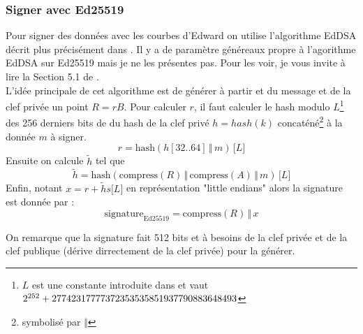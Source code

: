 \documentclass[a4paper, 12pt]{article}
\begin{document}
\subsubsection{Signer avec Ed25519}
Pour signer des données avec les courbes d'Edward on utilise l'algorithme EdDSA décrit plus précisément dans \cite{eddsa}.
Il y a de paramètre généreaux propre à l'agorithme EdDSA sur Ed25519 mais je ne les présentes pas. Pour les voir, je vous invite à lire la Section 5.1 de \cite{eddsa}.\\

L'idée principale de cet algorithme est de générer à partir et du message et de la clef privée un point $R = rB$.
Pour calculer $r$, il faut calculer le hash modulo $L$\footnote{$L$ est une constante introduite dans \cite{eddsa} et vaut $2^{252}+2774231777737235353585193779088364\\8493$} des 256 derniers bits de du hash de la clef privé $h = hash(k)$ concaténé\footnote{symbolisé par $\Vert$} à la donnée $m$ à signer.
$$
r = \text{hash}\left(h[32..64] \, \Vert \, m\right) \, \lbrack L \rbrack
$$
Ensuite on calcule $\tilde{h}$ tel que
$$
\tilde{h} = \text{hash}\left(\text{compress}(R) \, \Vert \, \text{compress}(A) \, \Vert \, m\right) \, \lbrack L \rbrack
$$
Enfin, notant $x = r+\tilde{h}s \lbrack L \rbrack$ en représentation "little endians" alors la signature est donnée par :
$$
\text{signature}_{\text{Ed25519}} = \text{compress}(R) \, \Vert \, x
$$

On remarque que la signature fait 512 bits et à besoins de la clef privée et de la clef publique (dérive dirrectement de la clef privée) pour la générer.
\end{document}
